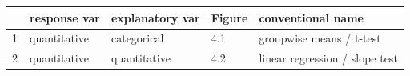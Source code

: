 \documentclass[]{tufte-book}
\begin{document}
\begin{longtable}[]{@{}lllll@{}}
\toprule
\begin{minipage}[b]{0.03\columnwidth}\raggedright
~\strut
\end{minipage} & \begin{minipage}[b]{0.24\columnwidth}\raggedright
response var\strut
\end{minipage} & \begin{minipage}[b]{0.29\columnwidth}\raggedright
explanatory var\strut
\end{minipage} & \begin{minipage}[b]{0.15\columnwidth}\raggedright
Figure\strut
\end{minipage} & \begin{minipage}[b]{0.14\columnwidth}\raggedright
conventional name\strut
\end{minipage}\tabularnewline
\midrule
\endhead
\begin{minipage}[t]{0.03\columnwidth}\raggedright
1\strut
\end{minipage} & \begin{minipage}[t]{0.24\columnwidth}\raggedright
quantitative\strut
\end{minipage} & \begin{minipage}[t]{0.29\columnwidth}\raggedright
categorical\strut
\end{minipage} & \begin{minipage}[t]{0.15\columnwidth}\raggedright
4.1\strut
\end{minipage} & \begin{minipage}[t]{0.14\columnwidth}\raggedright
groupwise means / t-test\strut
\end{minipage}\tabularnewline
\begin{minipage}[t]{0.03\columnwidth}\raggedright
2\strut
\end{minipage} & \begin{minipage}[t]{0.24\columnwidth}\raggedright
quantitative\strut
\end{minipage} & \begin{minipage}[t]{0.29\columnwidth}\raggedright
quantitative\strut
\end{minipage} & \begin{minipage}[t]{0.15\columnwidth}\raggedright
4.2\strut
\end{minipage} & \begin{minipage}[t]{0.14\columnwidth}\raggedright
linear regression / slope test\strut
\end{minipage}\tabularnewline

\end{longtable}
\end{document}
